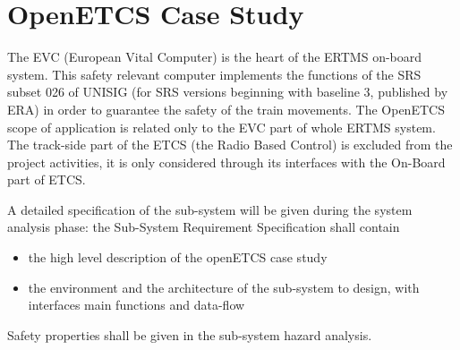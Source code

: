 \section{OpenETCS Case Study}




The EVC (European Vital Computer) is the heart of the ERTMS on-board system. This safety relevant
computer implements the functions of the SRS subset 026 of UNISIG (for SRS versions beginning
with baseline 3, published by ERA) in order to guarantee the safety of the train movements.
The OpenETCS scope of application is related only to the EVC part of whole ERTMS system.
The track-side part of the ETCS (the Radio Based Control) is excluded from the project activities, it is
only considered through its interfaces with the On-Board part of ETCS.

A detailed specification of the sub-system will be given during the system analysis phase: the Sub-System Requirement Specification shall contain 
\begin{itemize}
\item the high level description of the openETCS case study
\item the environment and the architecture of the sub-system  to design, with interfaces main functions and data-flow
\end{itemize}

Safety properties shall be given in the sub-system hazard analysis.

